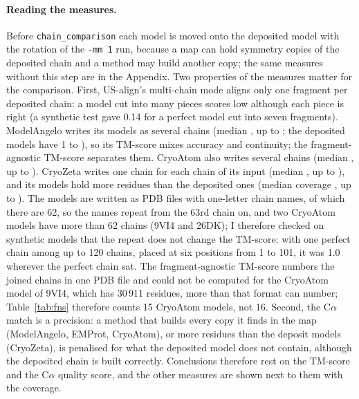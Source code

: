 \paragraph{Reading the measures.}
Before \texttt{chain\_comparison} each model is moved onto the deposited model with the rotation of the \texttt{-mm 1} run, because a map can hold symmetry copies of the deposited chain and a method may build another copy; the same measures without this step are in the Appendix. Two properties of the measures matter for the comparison. First, US-align's multi-chain mode aligns only one fragment per deposited chain: a model cut into many pieces scores low although each piece is right (a synthetic test gave 0.14 for a perfect model cut into seven fragments). ModelAngelo writes its models as several chains (median \ChainsMedAngelo{}, up to \ChainsMaxAngelo{}; the deposited models have 1 to \ChainsNativeMax{}), so its TM-score mixes accuracy and continuity; the fragment-agnostic TM-score separates them. CryoAtom also writes several chains (median \ChainsMedCryoatom{}, up to \ChainsMaxCryoatom{}). CryoZeta writes one chain for each chain of its input (median \ChainsMedCryozeta{}, up to \ChainsMaxCryozeta{}), and its models hold more residues than the deposited ones (median coverage \CovMedCryozeta{}, up to \CovMaxCryozeta{}). The models are written as PDB files with one-letter chain names, of which there are 62, so the names repeat from the 63rd chain on, and two CryoAtom models have more than 62 chains (9VI4 and 26DK); I therefore checked on synthetic models that the repeat does not change the TM-score: with one perfect chain among up to 120 chains, placed at six positions from 1 to 101, it was 1.0 wherever the perfect chain sat. The fragment-agnostic TM-score numbers the joined chains in one PDB file and could not be computed for the CryoAtom model of 9VI4, which has 30\,911 residues, more than that format can number; Table~\ref{tab:fns} therefore counts 15 CryoAtom models, not 16. Second, the C$\alpha$ match is a precision: a method that builds every copy it finds in the map (ModelAngelo, EMProt, CryoAtom), or more residues than the deposit models (CryoZeta), is penalised for what the deposited model does not contain, although the deposited chain is built correctly. Conclusions therefore rest on the TM-score and the C$\alpha$ quality score, and the other measures are shown next to them with the coverage.

